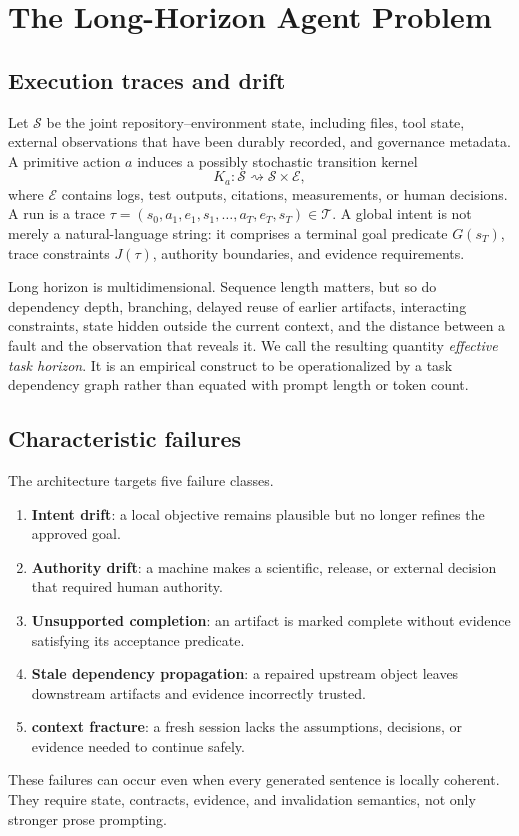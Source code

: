 \documentclass[11pt]{article}
\newcommand{\State}{\mathcal S}
\newcommand{\Trace}{\mathcal T}
\newcommand{\Evidence}{\mathcal E}
\begin{document}
\section{The Long-Horizon Agent Problem}
\subsection{Execution traces and drift}
Let $\State$ be the joint repository--environment state, including files, tool state, external observations that have been durably recorded, and governance metadata. A primitive action $a$ induces a possibly stochastic transition kernel
\[
K_a : \State \rightsquigarrow \State\times\Evidence,
\]
where $\Evidence$ contains logs, test outputs, citations, measurements, or human decisions. A run is a trace $\tau=(s_0,a_1,e_1,s_1,\ldots,a_T,e_T,s_T)\in\Trace$. A global intent is not merely a natural-language string: it comprises a terminal goal predicate $G(s_T)$, trace constraints $J(\tau)$, authority boundaries, and evidence requirements.

Long horizon is multidimensional. Sequence length matters, but so do dependency depth, branching, delayed reuse of earlier artifacts, interacting constraints, state hidden outside the current context, and the distance between a fault and the observation that reveals it. We call the resulting quantity \emph{effective task horizon}. It is an empirical construct to be operationalized by a task dependency graph rather than equated with prompt length or token count.

\subsection{Characteristic failures}
The architecture targets five failure classes.
\begin{enumerate}
\item \textbf{Intent drift}: a local objective remains plausible but no longer refines the approved goal.
\item \textbf{Authority drift}: a machine makes a scientific, release, or external decision that required human authority.
\item \textbf{Unsupported completion}: an artifact is marked complete without evidence satisfying its acceptance predicate.
\item \textbf{Stale dependency propagation}: a repaired upstream object leaves downstream artifacts and evidence incorrectly trusted.
\item \textbf{context fracture}: a fresh session lacks the assumptions, decisions, or evidence needed to continue safely.
\end{enumerate}
These failures can occur even when every generated sentence is locally coherent. They require state, contracts, evidence, and invalidation semantics, not only stronger prose prompting.
\end{document}
